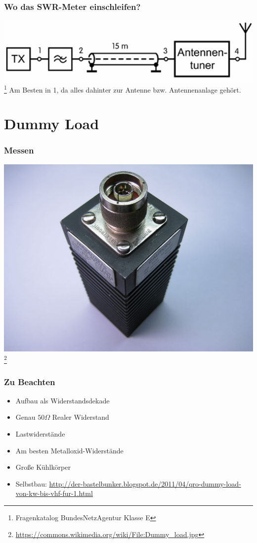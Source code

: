 \begin{frame}
    \frametitle{Wo das SWR-Meter einschleifen?}
    \includegraphics[width=.97\textwidth,height=.4\textheight,keepaspectratio]{e17/SWROrt.png}
    \footnote{\tiny Fragenkatalog BundesNetzAgentur Klasse E}
    \pause
    Am Besten in 1, da alles dahinter zur Antenne bzw. Antennenanlage gehört.
\end{frame}


\section*{Dummy Load}

\begin{frame}
    \frametitle{Messen}
    \begin{center}
        \includegraphics[width=.99\textwidth,height=.8\textheight,keepaspectratio]{e17/DummyLoad.jpg}
        \footnote{\tiny \url{https://commons.wikimedia.org/wiki/File:Dummy_load.jpg}}
	\end{center}
\end{frame}

\begin{frame}
    \frametitle{Zu Beachten}
    \begin{itemize}
		\item Aufbau als Widerstandsdekade
		\item Genau $50 \Omega$ Realer Widerstand
		\item Lastwiderstände
		\item Am besten Metalloxid-Widerstände
		\item Große Kühlkörper
		\item Selbstbau: \url{http://der-bastelbunker.blogspot.de/2011/04/qro-dummy-load-von-kw-bis-vhf-fur-1.html}
    \end{itemize}
\end{frame}

